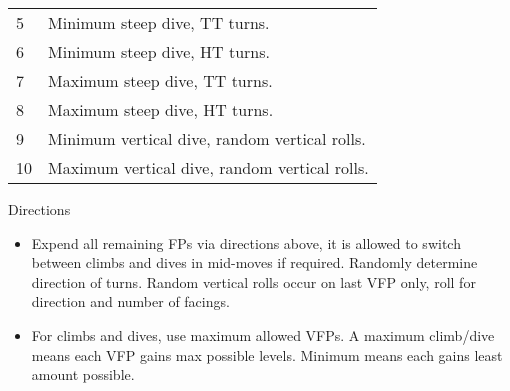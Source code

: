 \begin{TABLE}
\begin{tabularx}{\linewidth}{lX}
5   &Minimum steep dive, TT turns.\\
6   &Minimum steep dive, HT turns.\\
7   &Maximum steep dive, TT turns.\\
8   &Maximum steep dive, HT turns.\\
9   &Minimum vertical dive, random vertical rolls.\\
10  &Maximum vertical dive, random vertical rolls.\\
\hline
\end{tabularx}
\begin{tablenote}{\linewidth}
{\centering Directions\par\smallskip}

\begin{itemize}
    \item Expend all remaining FPs via directions above, it is allowed to switch between climbs and dives in mid-moves if required. Randomly determine direction of turns. Random vertical rolls occur on last VFP only, roll for direction and number of facings.
    \item For climbs and dives, use maximum allowed VFPs. A maximum climb/dive means each VFP gains max possible levels. Minimum means each gains least amount possible.
\end{itemize}
\end{tablenote}
\end{TABLE}
